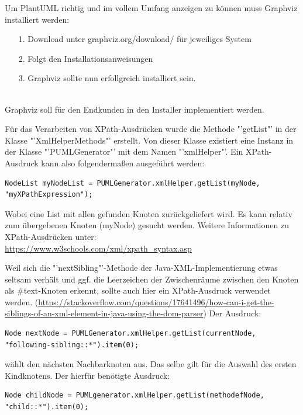 Um PlantUML richtig und im vollem Umfang anzeigen zu können muss Graphviz installiert werden:
\begin{itemize}
\item[1.] Download unter graphviz.org/download/ für jeweiliges System
\item[2.] Folgt den Installationsanweisungen
\item[3.] Graphviz sollte nun erfollgreich installiert sein.
\end{itemize}\\
Graphviz soll für den Endkunden in den Installer implementiert werden.
\nsecend %
\nsecend %

Für das Verarbeiten von XPath-Ausdrücken wurde die Methode "'getList"' in der Klasse "'XmlHelperMethods"' erstellt. Von dieser Klasse existiert eine Instanz in der Klasse "'PUMLGenerator"' mit dem Namen "'xmlHelper"'. Ein XPath-Ausdruck kann also folgendermaßen ausgeführt werden:
\begin{lstlisting}
NodeList myNodeList = PUMLGenerator.xmlHelper.getList(myNode, "myXPathExpression");
\end{lstlisting}
Wobei eine List mit allen gefunden Knoten zurückgeliefert wird. Es kann relativ zum übergebenen Knoten (myNode) gesucht werden.
Weitere Informationen zu XPath-Ausdrücken unter:\\
\url{https://www.w3schools.com/xml/xpath_syntax.asp}
\nsecend

Weil sich die "'nextSibling"'-Methode der Java-XML-Implementierung etwas seltsam verhält und ggf. die Leerzeichen der Zwischenräume zwischen den Knoten als #text-Knoten erkennt, sollte auch hier ein XPath-Ausdruck verwendet werden. (\url{https://stackoverflow.com/questions/17641496/how-can-i-get-the-siblings-of-an-xml-element-in-java-using-the-dom-parser}) Der Ausdruck:
\begin{lstlisting}
Node nextNode = PUMLGenerator.xmlHelper.getList(currentNode, "following-sibling::*").item(0);
\end{lstlisting}
wählt den nächsten Nachbarknoten aus. Das selbe gilt für die Auswahl des ersten Kindknotens. Der hierfür benötigte Ausdruck:
\begin{lstlisting}
Node childNode = PUMLgenerator.xmlHelper.getList(methodefNode, "child::*").item(0);
\end{lstlisting}
\nsecend
\nsecend %

\nsecend %